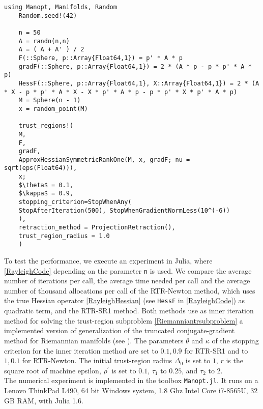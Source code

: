 \begin{lstlisting}[mathescape, caption={The Rayleigh quotient minimization experiment in Julia for $n = 500$.}, label={RayleighCode}]
    using Manopt, Manifolds, Random
    Random.seed!(42)

    n = 50
    A = randn(n,n)
    A = ( A + A' ) / 2
    F(::Sphere, p::Array{Float64,1}) = p' * A * p
    gradF(::Sphere, p::Array{Float64,1}) = 2 * (A * p - p * p' * A * p)
    HessF(::Sphere, p::Array{Float64,1}, X::Array{Float64,1}) = 2 * (A * X - p * p' * A * X - X * p' * A * p - p * p' * X * p' * A * p)
    M = Sphere(n - 1)
    x = random_point(M)

    trust_regions!(
    M,
    F,
    gradF,
    ApproxHessianSymmetricRankOne(M, x, gradF; nu = sqrt(eps(Float64))),
    x;
    $\theta$ = 0.1,
    $\kappa$ = 0.9,
    stopping_criterion=StopWhenAny(
    StopAfterIteration(500), StopWhenGradientNormLess(10^(-6))
    ),
    retraction_method = ProjectionRetraction(),
    trust_region_radius = 1.0
    )
\end{lstlisting}
To test the performance, we execute an experiment in Julia, where \cref{RayleighCode} depending on the parameter \lstinline!n! is used. We compare the average number of iterations per call, the average time needed per call and the average number of thousand allocations per call of the RTR-Newton method, which uses the true Hessian operator \cref{RayleighHessian} (see \lstinline!HessF! in \cref{RayleighCode}) as quadratic term, and the RTR-SR1 method. Both methods use as inner iteration method for solving the trust-region subproblem \cref{Riemanniantrsubproblem} a implemented version of generalization of the truncated conjugate-gradient method for Riemannian manifolds (see \cite[Algorithm~11]{AbsilMahonySepulchre:2008}). The parameters $\theta$ and $\kappa$ of the stopping criterion \cite[(7.10)]{AbsilMahonySepulchre:2008} for the inner iteration method are set to $0.1, 0.9$ for RTR-SR1 and to $1, 0.1$ for RTR-Newton. The initial trust-region radius $\Delta_0$ is set to $1$, $r$ is the square root of machine epsilon, $\rho^{\prime}$ is set to $0.1$, $\tau_1$ to $0.25$, and $\tau_2$ to $2$. \\
The numerical experiment is implemented in the toolbox \lstinline!Manopt.jl!. It runs on a Lenovo ThinkPad L490, 64 bit Windows system, 1.8 Ghz Intel Core i7-8565U, 32 GB RAM, with Julia 1.6.
